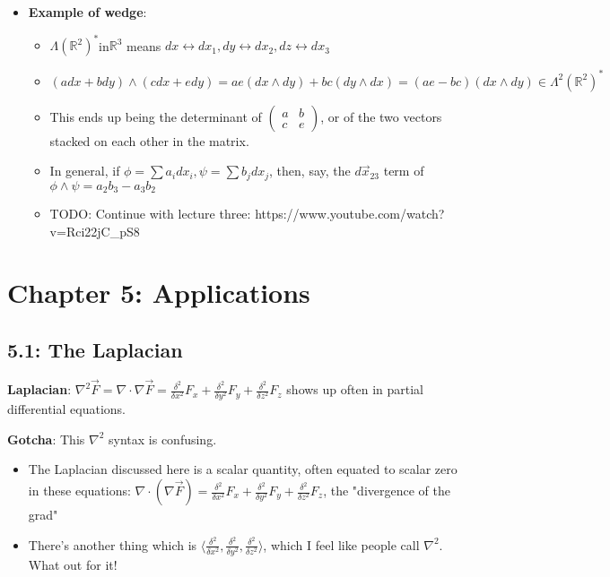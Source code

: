 \documentclass[11pt, oneside]{article}   	%
\begin{document}
\begin{itemize}
\item \textbf{Example of wedge}: 

\begin{itemize}
\item $\Lambda(\mathbb{R}^2)^* $in$ \mathbb{R}^3$ means $dx \leftrightarrow dx_1, dy \leftrightarrow dx_2, dz \leftrightarrow dx_3$
\item $(adx + bdy) \wedge (cdx + edy) = ae(dx\wedge dy) + bc (dy \wedge dx) = (ae-bc)(dx \wedge dy)  \in \Lambda^2(\mathbb{R}^2)^*$
\item This ends up being the determinant of $\begin{pmatrix} a & b \\ c & e \end{pmatrix}$, or of the two vectors stacked on each other in the matrix.
\item In general, if $\phi = \sum a_i dx_i, \psi = \sum b_j dx_j$, then, say, the $d\vec{x}_{23}$ term of $\phi \wedge \psi = a_2b_3-a_3b_2$
\item TODO: Continue with lecture three:  https://www.youtube.com/watch?v=Rci22jC\_pS8
\end{itemize}
\end{itemize}

\section{Chapter 5: Applications}
\subsection{5.1: The Laplacian}

\textbf{Laplacian}: $\nabla^2 \vec{F} = \nabla \cdot \nabla \vec{F} = \frac{\delta^2}{\delta x^2}F_x + \frac{\delta^2}{\delta y^2}F_y + \frac{\delta^2}{\delta z^2}F_z$ shows up often in partial differential equations.  

\textbf{Gotcha}: This $\nabla^2$ syntax is confusing.  
\begin{itemize}
\item The Laplacian discussed here is a scalar quantity, often equated to scalar zero in these equations: $\nabla \cdot (\nabla \vec{F}) = \frac{\delta^2}{\delta x^2}F_x + \frac{\delta^2}{\delta y^2}F_y + \frac{\delta^2}{\delta z^2}F_z$, the "divergence of the grad"
\item There's another thing which is $\langle \frac{\delta^2}{\delta x^2}, \frac{\delta^2}{\delta y^2}, \frac{\delta^2}{\delta z^2} \rangle$, which I feel like people call $\nabla^2$.  What out for it!
\end{itemize}
\end{document}
